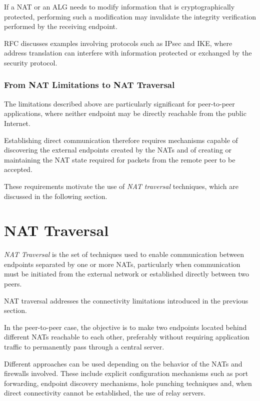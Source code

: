 If a NAT or an ALG needs to modify information that is cryptographically protected, performing such a modification may invalidate the integrity verification performed by the receiving endpoint.

RFC \cite{rfc3027} discusses examples involving protocols such as IPsec and IKE, where address translation can interfere with information protected or exchanged by the security protocol.

\subsubsection{From NAT Limitations to NAT Traversal}

The limitations described above are particularly significant for peer-to-peer applications, where neither endpoint may be directly reachable from the public Internet.

Establishing direct communication therefore requires mechanisms capable of discovering the external endpoints created by the NATs and of creating or maintaining the NAT state required for packets from the remote peer to be accepted.

These requirements motivate the use of \textit{NAT traversal} techniques, which are discussed in the following section.

\section{NAT Traversal}
\begin{definition}
	\textit{NAT Traversal} is the set of techniques used to enable communication between endpoints separated by one or more NATs, particularly when communication must be initiated from the external network or established directly between two peers.
\end{definition}

NAT traversal addresses the connectivity limitations introduced in the previous section.

In the peer-to-peer case, the objective is to make two endpoints located behind different NATs reachable to each other, preferably without requiring application traffic to permanently pass through a central server.

Different approaches can be used depending on the behavior of the NATs and firewalls involved. These include explicit configuration mechanisms such as port forwarding, endpoint discovery mechanisms, hole punching techniques and, when direct connectivity cannot be established, the use of relay servers.

